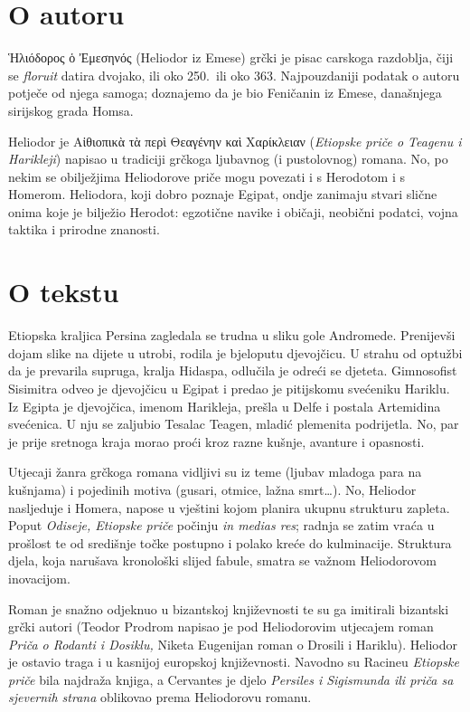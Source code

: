 \section*{O autoru}

\textgreek[variant=ancient]{Ἡλιόδορος ὁ Ἐμεσηνός} (Heliodor iz Emese) grčki je pisac carskoga razdoblja, čiji se \textit{floruit} datira dvojako, ili oko 250.\ ili oko 363. Najpouzdaniji podatak o autoru potječe od njega samoga; doznajemo da je bio Feničanin iz Emese, današnjega sirijskog grada Homsa.

Heliodor je \textgreek[variant=ancient]{Αἰθιοπικὰ τὰ περὶ Θεαγένην καὶ Χαρίκλειαν} (\textit{Etiopske priče o Teagenu i Harikleji}) napisao u tradiciji grčkoga ljubavnog (i pustolovnog) romana. No, po nekim se obilježjima Heliodorove priče mogu povezati i s Herodotom i s Homerom. Heliodora, koji dobro poznaje Egipat, ondje zanimaju stvari slične onima koje je bilježio Herodot: egzotične navike i običaji, neobični podatci, vojna taktika i prirodne znanosti.


\section*{O tekstu}

Etiopska kraljica Persina zagledala se trudna u sliku gole Andromede. Prenijevši dojam slike na dijete u utrobi, rodila je bjeloputu djevojčicu. U strahu od optužbi da je prevarila supruga, kralja Hidaspa, odlučila je odreći se djeteta. Gimnosofist Sisimitra odveo je djevojčicu u Egipat i predao je pitijskomu svećeniku Hariklu. Iz Egipta je djevojčica, imenom Harikleja, prešla u Delfe i postala Artemidina svećenica. U nju se zaljubio Tesalac Teagen, mladić plemenita podrijetla. No, par je prije sretnoga kraja morao proći kroz razne kušnje, avanture i opasnosti.

Utjecaji žanra grčkoga romana vidljivi su iz teme (ljubav mladoga para na kušnjama) i pojedinih motiva (gusari, otmice, lažna smrt\dots). No, Heliodor nasljeduje i Homera, napose u vještini kojom planira ukupnu strukturu zapleta. Poput \textit{Odiseje, Etiopske priče} počinju \textit{in medias res}; radnja se zatim vraća u prošlost te od središnje točke postupno i polako kreće do kulminacije. Struktura djela, koja narušava kronološki slijed fabule, smatra se važnom Heliodorovom inovacijom. 

Roman je snažno odjeknuo u bizantskoj književnosti te su ga imitirali bizantski grčki autori (Teodor Prodrom napisao je pod Heliodorovim utjecajem roman \textit{Priča o Rodanti i Dosiklu,} Niketa Eugenijan roman o Drosili i Hariklu). Heliodor je ostavio traga i u kasnijoj europskoj književnosti. Navodno su Racineu \textit{Etiopske priče} bila najdraža knjiga, a Cervantes je djelo \textit{Persiles i Sigismunda ili priča sa sjevernih strana} oblikovao prema Heliodorovu romanu.

